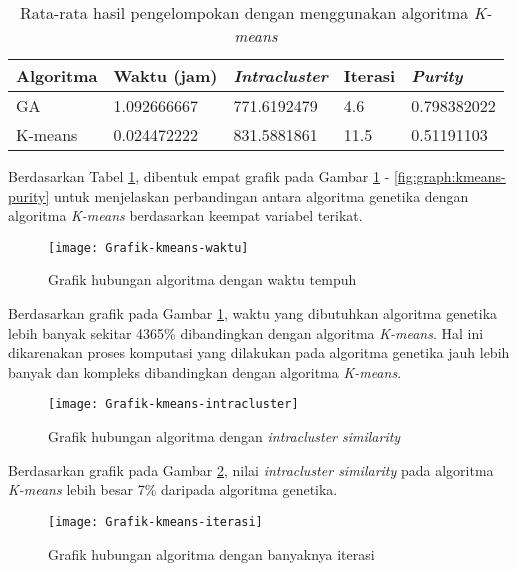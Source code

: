 \begin{table}[H]
	\centering
	\begin{tabular}{|l|l|l|l|l|} \hline
		Algoritma & Waktu (jam) & \textit{Intracluster} & Iterasi& \textit{Purity} \\ \hline
		GA      & 1.092666667 & 771.6192479 & 4.6  & 0.798382022 \\
		K-means & 0.024472222 & 831.5881861 & 11.5 & 0.51191103 \\ \hline
	\end{tabular}
	\caption{Rata-rata hasil pengelompokan dengan menggunakan algoritma \textit{K-means}}
	\label{tbl:exp-kmeans}
\end{table}

Berdasarkan Tabel \ref{tbl:exp-kmeans}, dibentuk empat grafik pada Gambar \ref{fig:graph:kmeans-time} - \ref{fig:graph:kmeans-purity} untuk menjelaskan perbandingan antara algoritma genetika dengan algoritma \textit{K-means} berdasarkan keempat variabel terikat.

\begin{figure}[H]
	\centering
	\texttt{[image: Grafik-kmeans-waktu]}
	\caption{Grafik hubungan algoritma dengan waktu tempuh}
	\label{fig:graph:kmeans-time}
\end{figure}

Berdasarkan grafik pada Gambar \ref{fig:graph:kmeans-time}, waktu yang dibutuhkan algoritma genetika lebih banyak sekitar 4365\% dibandingkan dengan algoritma \textit{K-means}. Hal ini dikarenakan proses komputasi yang dilakukan pada algoritma genetika jauh lebih banyak dan kompleks dibandingkan dengan algoritma \textit{K-means}.

\begin{figure}[H]
	\centering
	\texttt{[image: Grafik-kmeans-intracluster]}
	\caption{Grafik hubungan algoritma dengan \textit{intracluster similarity}}
	\label{fig:graph:kmeans-intra}
\end{figure}

Berdasarkan grafik pada Gambar \ref{fig:graph:kmeans-intra}, nilai \textit{intracluster similarity} pada algoritma \textit{K-means} lebih besar 7\% daripada algoritma genetika.

\begin{figure}[H]
	\centering
	\texttt{[image: Grafik-kmeans-iterasi]}
	\caption{Grafik hubungan algoritma dengan banyaknya iterasi}
	\label{fig:graph:kmeans-iteration}
\end{figure}

